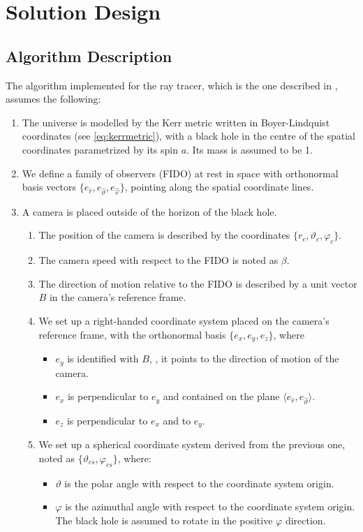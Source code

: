 \chapter{Solution Design}

\section{Algorithm Description}

The algorithm implemented for the ray tracer, which is the one described in \cite{thorne15}, assumes the following:
\begin{enumerate}
	\item The universe is modelled by the Kerr metric written in Boyer-Lindquist coordinates (see \autoref{eq:kerrmetric}), with a black hole in the centre of the spatial coordinates parametrized by its spin $a$. Its mass is assumed to be 1.
	\item We define a family of observers (FIDO) at rest in space with orthonormal basis vectors $\{e_{\widehat{r}}, e_{\widehat{\vartheta}}, e_{\widehat{\varphi}}\}$, pointing along the spatial coordinate lines.
	\item A camera is placed outside of the horizon of the black hole.
	\begin{enumerate}
		\item The position of the camera is described by the coordinates $\{r_c, \vartheta_c, \varphi_c\}$.
		\item The camera speed with respect to the FIDO is noted as $\beta$.
		\item The direction of motion relative to the FIDO is described by a unit vector $B$ in the camera's reference frame.
		\item We set up a right-handed coordinate system placed on the camera's reference frame, with the orthonormal basis $\{e_x, e_y, e_z\}$, where
		\begin{itemize}
			\item $e_y$ is identified with $B$, \ie, it points to the direction of motion of the camera.
			\item $e_x$ is perpendicular to $e_y$ and contained on the plane $\langle e_{\widehat{r}}, e_{\widehat{\vartheta}} \rangle$.
			\item $e_z$ is perpendicular to $e_x$ and to $e_y$.
		\end{itemize}
		\item We set up a spherical coordinate system derived from the previous one, noted as $\{\vartheta_{cs}, \varphi_{cs}\}$, where:
		\begin{itemize}
			\item $\vartheta$ is the polar angle with respect to the coordinate system origin.
			\item $\varphi$ is the azimuthal angle with respect to the coordinate system origin. The black hole is assumed to rotate in the positive $\varphi$ direction.
		\end{itemize}
	\end{enumerate}
\end{enumerate}

